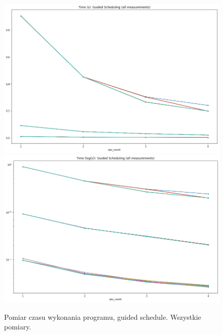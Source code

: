 \documentclass{article}
\begin{document}
        \begin{figure}[h!]
            \centering
            \includegraphics[width=17cm]{report2/images/Type/ex3_guided_all.png}
            \includegraphics[width=17cm]{report2/images/Type/ex3_guided_all_log.png}
            \caption{Pomiar czasu wykonania programu, guided schedule. Wszystkie pomiary. }
        \end{figure}
        \newpage
\end{document}
